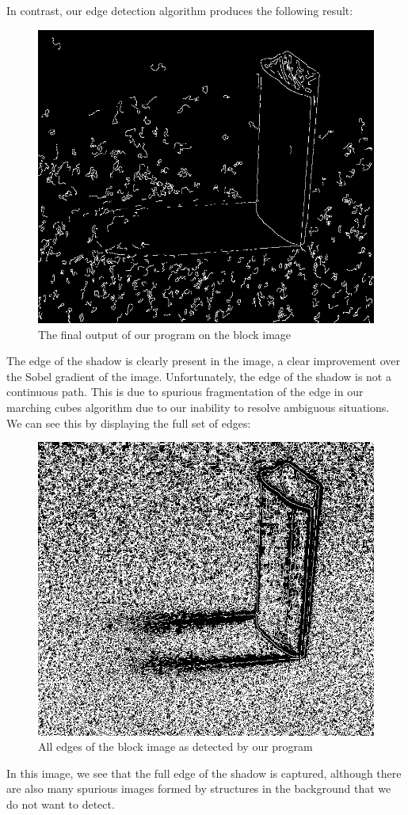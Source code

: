 \documentclass{article}
\begin{document}
In contrast, our edge detection algorithm produces the following result:
\begin{figure}[H]
  \centering
  \includegraphics[scale=0.3]{Images/block/block_final.png}
  \caption{The final output of our program on the block image}
  \label{block_final}
\end{figure}
The edge of the shadow is clearly present in the image, a clear improvement over the Sobel gradient of the image.
Unfortunately, the edge of the shadow is not a continuous path.
This is due to spurious fragmentation of the edge in our marching cubes algorithm due to our inability to resolve ambiguous situations.
We can see this by displaying the full set of edges:
\begin{figure}[H]
  \centering
  \includegraphics[scale=0.3]{Images/block/block_all_edges.png}
  \caption{All edges of the block image as detected by our program}
  \label{block_all_edges}
\end{figure}
In this image, we see that the full edge of the shadow is captured, although there are also many spurious images formed by structures in the background that we do not want to detect.
\end{document}
